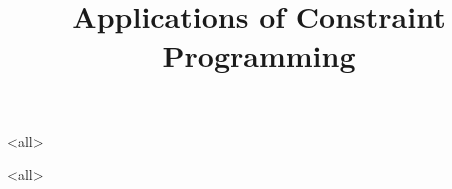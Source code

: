 \title[Applications] %
{Applications of Constraint Programming}

\subtitle
{} %



\mode<all>{

}
\mode<all>{

}


